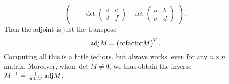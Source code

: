 {$$\begin{pmatrix}
&-\det\begin{pmatrix}a&c\\d&f\end{pmatrix}
&\det\begin{pmatrix}a&b\\c&d\end{pmatrix}
\end{pmatrix}\, .
$$
Then the adjoint is just the transpose
$$
{\rm adj}M=\big({\rm cofactor} M\big)^T\, .
$$
Computing all this is a little tedious, but always works, even for any $n\times n$ matrix.
Moreover, when $\det M \neq 0$, we thus obtain the inverse
$
M^{-1}=\frac{1}{\det M}\, {\rm adj}M
$.


}

\newpage
